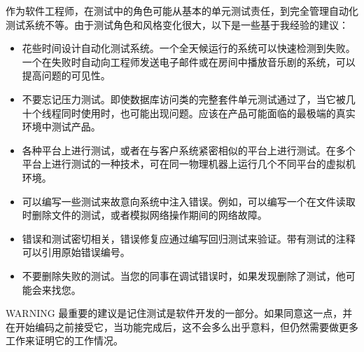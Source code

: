 作为软件工程师，在测试中的角色可能从基本的单元测试责任，到完全管理自动化测试系统不等。由于测试角色和风格变化很大，以下是一些基于我经验的建议：

\begin{itemize}
\item
花些时间设计自动化测试系统。一个全天候运行的系统可以快速检测到失败。一个在失败时自动向工程师发送电子邮件或在房间中播放音乐剧的系统，可以提高问题的可见性。

\item
不要忘记压力测试。即使数据库访问类的完整套件单元测试通过了，当它被几十个线程同时使用时，也可能出现问题。应该在产品可能面临的最极端的真实环境中测试产品。

\item
各种平台上进行测试，或者在与客户系统紧密相似的平台上进行测试。在多个平台上进行测试的一种技术，可在同一物理机器上运行几个不同平台的虚拟机环境。

\item
可以编写一些测试来故意向系统中注入错误。例如，可以编写一个在文件读取时删除文件的测试，或者模拟网络操作期间的网络故障。

\item
错误和测试密切相关，错误修复应通过编写回归测试来验证。带有测试的注释可以引用原始错误编号。

\item
不要删除失败的测试。当您的同事在调试错误时，如果发现删除了测试，他可能会来找您。
\end{itemize}

\begin{myWarning}{WARNING}
最重要的建议是记住测试是软件开发的一部分。如果同意这一点，并在开始编码之前接受它，当功能完成后，这不会多么出乎意料，但仍然需要做更多工作来证明它的工作情况。
\end{myWarning}